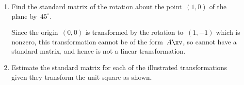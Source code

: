 \begin{example}
\begin{enumerate}
\item Find the standard matrix of the rotation about the point~\((1,0)\) of the plane by~\(45^\circ\).
\begin{solution} 
Since the origin~\((0,0)\) is transformed by the rotation to~\((1,-1)\) which is nonzero, this transformation cannot be of the form~\(A\xv\), so cannot have a standard matrix, and hence is not a linear transformation.
\end{solution}


\item Estimate the standard matrix for each of the illustrated transformations given they transform the unit square as shown.
\def\unithousesize{footnotesize,grid}
\newcommand{\TwoDmat}[4]{\TwoD{#1}{#2}{#3}{#4}
\\\emph{Solution:} Here \(T(1,0)\approx(#1,#3)\) and \(T(0,1)\approx(#2,#4)\) so the approximate standard matrix is \(\begin{bmatrix} #1&#2\\#3&#4 \end{bmatrix}\).}

\end{enumerate}
\end{example}




